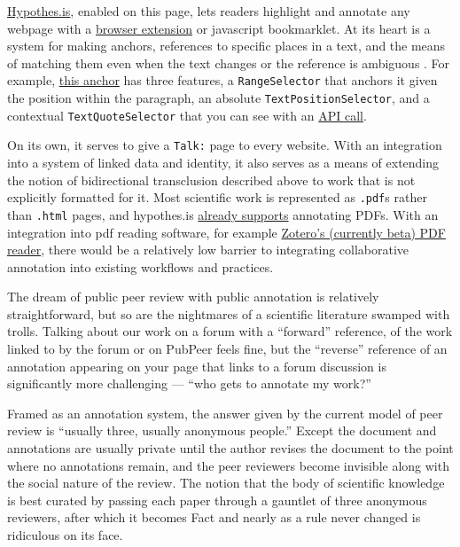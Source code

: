 \documentclass[notoc]{tufte-book}
\begin{document}
\href{https://hypothes.is}{Hypothes.is}, enabled on this page, lets
readers highlight and annotate any webpage with a
\href{https://chrome.google.com/webstore/detail/hypothesis-web-pdf-annota/bjfhmglciegochdpefhhlphglcehbmek}{browser
extension} or javascript bookmarklet. At its heart is a system for
making anchors, references to specific places in a text, and the means
of matching them even when the text changes or the reference is
ambiguous \citep{csillagFuzzyAnchoring2013} . For example,
\href{https://hypothes.is/a/oLw4uk7_Eeyt5N-FVlE3fw}{this anchor} has
three features, a \texttt{RangeSelector} that anchors it given the
position within the paragraph, an absolute
\texttt{TextPositionSelector}, and a contextual
\texttt{TextQuoteSelector} that you can see with an
\href{https://api.hypothes.is/api/annotations/oLw4uk7_Eeyt5N-FVlE3fw}{API
call}.

On its own, it serves to give a \texttt{Talk:} page to every website.
With an integration into a system of linked data and identity, it also
serves as a means of extending the notion of bidirectional transclusion
described above to work that is not explicitly formatted for it. Most
scientific work is represented as \texttt{.pdf}s rather than
\texttt{.html} pages, and hypothes.is
\href{https://web.hypothes.is/help/annotating-locally-saved-pdfs/}{already
supports} annotating PDFs. With an integration into pdf reading
software, for example
\href{https://www.zotero.org/support/pdf_reader_preview}{Zotero's
(currently beta) PDF reader}, there would be a relatively low barrier to
integrating collaborative annotation into existing workflows and
practices.

The dream of public peer review with public annotation is relatively
straightforward, but so are the nightmares of a scientific literature
swamped with trolls. Talking about our work on a forum with a
``forward'' reference, of the work linked to by the forum or on PubPeer
feels fine, but the ``reverse'' reference of an annotation appearing on
your page that links to a forum discussion is significantly more
challenging --- ``who gets to annotate my work?''

Framed as an annotation system, the answer given by the current model of
peer review is ``usually three, usually anonymous people.'' Except the
document and annotations are usually private until the author revises
the document to the point where no annotations remain, and the peer
reviewers become invisible along with the social nature of the review.
The notion that the body of scientific knowledge is best curated by
passing each paper through a gauntlet of three anonymous reviewers,
after which it becomes Fact and nearly as a rule never changed is
ridiculous on its face.
\end{document}
